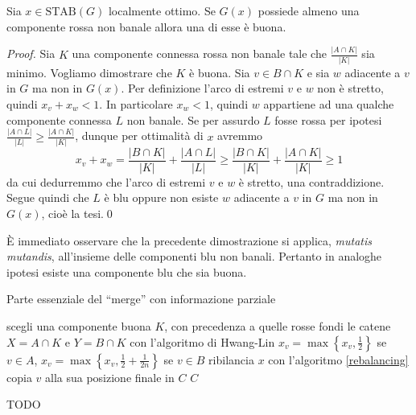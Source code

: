 \begin{lemma}
	\label{goodlemma} Sia \(x\in \text{STAB}(G)\) localmente ottimo. Se \(G(x)\) possiede almeno una componente rossa non banale allora una di esse è buona. 
\end{lemma}
\begin{proof}
	Sia \(K\) una componente connessa rossa non banale tale che \(\frac{|A\cap K|}{|K|}\) sia minimo. Vogliamo dimostrare che \(K\) è buona. Sia \(v\in B\cap K\) e sia \(w\) adiacente a \(v\) in \(G\) ma non in \(G(x)\). Per definizione l'arco di estremi \(v\) e \(w\) non è stretto, quindi \(x_v+x_w<1\). In particolare \(x_w<1\), quindi \(w\) appartiene ad una qualche componente connessa \(L\) non banale. Se per assurdo \(L\) fosse rossa per ipotesi \(\frac{|A\cap L|}{|L|}\ge\frac{|A\cap K|}{|K|}\), dunque per ottimalità di \(x\) avremmo
	\[x_v+x_w=\frac{|B\cap K|}{|K|}+\frac{|A\cap L|}{|L|}\ge\frac{|B\cap K|}{|K|}+\frac{|A\cap K|}{|K|}\ge 1\]
	da cui dedurremmo che l'arco di estremi \(v\) e \(w\) è stretto, una contraddizione. Segue quindi che \(L\) è blu oppure non esiste \(w\) adiacente a \(v\) in \(G\) ma non in \(G(x)\), cioè la tesi.\qed 
\end{proof}
È immediato osservare che la precedente dimostrazione si applica, \emph{mutatis mutandis}, all'insieme delle componenti blu non banali. Pertanto in analoghe ipotesi esiste una componente blu che sia buona.
\begin{algorithm}
	\caption{Parte essenziale del ``merge'' con informazione parziale} \label{essentialmerge}
	\begin{algorithmic}
		[1] 
		        \STATE scegli una componente buona \(K\), con precedenza a quelle rosse
		        \STATE fondi le catene \(X=A\cap K\) e \(Y=B\cap K\) con l'algoritmo di Hwang-Lin
                    \STATE \(x_v=\max{\left\{x_v, \frac{1}{2}\right\}}\) se \(v\in A\), \(x_v=\max{\left\{x_v, \frac{1}{2}+\frac{1}{2n}\right\}}\) se \(v\in B\)
                \ENDFOR
                \STATE ribilancia \(x\) con l'algoritmo \ref{rebalancing}
                        \STATE copia \(v\) alla sua posizione finale in \(C\)
                    \ENDIF
                \ENDFOR
		    \ENDWHILE
            \RETURN \(C\)
	\end{algorithmic}
\end{algorithm}
\begin{lemma}
	\label{evolutionlemma} TODO
\end{lemma}
